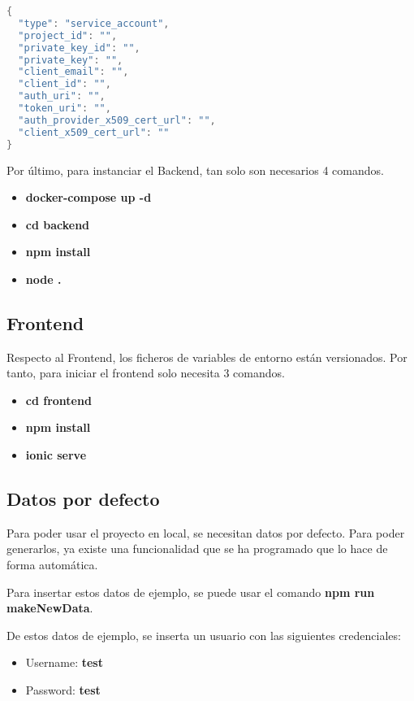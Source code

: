 \begin{lstlisting}[language=Java,caption={Fichero firebaseServiceAccount.json},captionpos=b]
{
  "type": "service_account",
  "project_id": "",
  "private_key_id": "",
  "private_key": "",
  "client_email": "",
  "client_id": "",
  "auth_uri": "",
  "token_uri": "",
  "auth_provider_x509_cert_url": "",
  "client_x509_cert_url": ""
}
\end{lstlisting}

Por último, para instanciar el Backend, tan solo son necesarios 4 comandos.

\begin{itemize}
    \item \textbf{docker-compose up -d}
    \item \textbf{cd backend}
    \item \textbf{npm install}
    \item \textbf{node .}
\end{itemize}

\subsection{Frontend}
Respecto al Frontend, los ficheros de variables de entorno están versionados. Por tanto, para iniciar el frontend solo necesita 3 comandos.

\begin{itemize}
    \item \textbf{cd frontend}
    \item \textbf{npm install}
    \item \textbf{ionic serve}
\end{itemize}

\subsection{Datos por defecto}
Para poder usar el proyecto en local, se necesitan datos por defecto. Para poder generarlos, ya existe una funcionalidad que se ha programado que lo hace de forma automática.

Para insertar estos datos de ejemplo, se puede usar el comando \textbf{npm run makeNewData}.

De estos datos de ejemplo, se inserta un usuario con las siguientes credenciales:

\begin{itemize}
    \item Username: \textbf{test}
    \item Password: \textbf{test}
\end{itemize}

